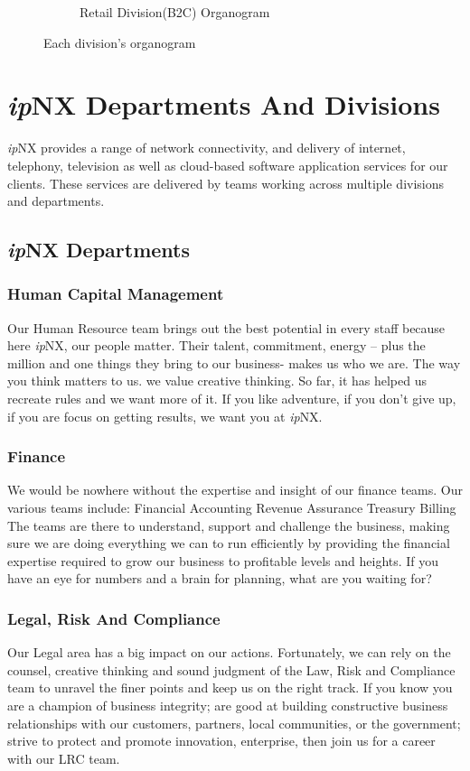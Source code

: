 \begin{figure}[h!]
\begin{subfigure}[b]{0.5\textwidth}
		\caption{Retail Division(B2C) Organogram}
	\end{subfigure}
	\caption{Each division's organogram}
\end{figure}
\section{\textit{ip}NX Departments And Divisions}
\textit{ip}NX provides a range of network connectivity, and delivery of internet, telephony, television as well as cloud-based software application services for our clients. These services are delivered by teams working across multiple divisions and departments.
\subsection{\textit{ip}NX Departments}
\subsubsection{Human Capital Management}
Our Human Resource team brings out the best potential in every staff because here \textit{ip}NX, our people matter. Their talent, commitment, energy – plus the million and one things they bring to our business- makes us who we are. The way you think matters to us. we value creative thinking. So far, it has helped us recreate rules and we want more of it. If you like adventure, if you don't give up, if you are focus on getting results, we want you at \textit{ip}NX.
\subsubsection{Finance}
We would be nowhere without the expertise and insight of our finance teams. Our various teams include: Financial Accounting Revenue Assurance Treasury Billing The teams are there to understand, support and challenge the business, making sure we are doing everything we can to run efficiently by providing the financial expertise required to grow our business to profitable levels and heights. If you have an eye for numbers and a brain for planning, what are you waiting for?
\subsubsection{Legal, Risk And Compliance}
Our Legal area has a big impact on our actions. Fortunately, we can rely on the counsel, creative thinking and sound judgment of the Law, Risk and Compliance team to unravel the finer points and keep us on the right track. If you know you are a champion of business integrity; are good at building constructive business relationships with our customers, partners, local communities, or the government; strive to protect and promote innovation, enterprise, then join us for a career with our LRC team.
